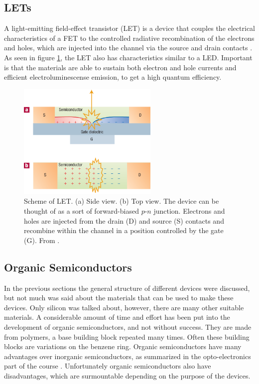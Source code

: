 \subsection{LETs}

A light-emitting field-effect transistor (LET) is a device that couples the electrical characteristics of a FET to the controlled radiative recombination of the electrons and holes, which are injected into the channel via the source and drain contacts \citep{Muccini}. As seen in figure \ref{fig:LET}, the LET also has characteristics similar to a LED. Important is that the materials are able to sustain both electron and hole currents and efficient electroluminescense emission, to get a high quantum efficiency.

\begin{figure}[!ht]
 \begin{center}
  \includegraphics[width=0.6\textwidth]{fig_B1}
  \caption{Scheme of LET. (a) Side view. (b) Top view. The device can be thought of as a sort of forward-biased $p$-$n$ junction. Electrons and holes are injected from the drain (D) and source (S) contacts and recombine within the channel in a position controlled by the gate (G). From \citet{Muccini}.}
  \label{fig:LET}
 \end{center}
\end{figure}


\subsection{Organic Semiconductors}
In the previous sections the general structure of different devices were discussed, but not much was said about the materials that can be used to make these devices. Only silicon was talked about, however, there are many other suitable materials. A considerable amount of time and effort has been put into the development of organic semiconductors, and not without success. They are made from polymers, a base building block repeated many times. Often these building blocks are variations on the benzene ring. Organic semiconductors have many advantages over inorganic semiconductors, as summarized in the opto-electronics part of the course \citep{loinotes}. Unfortunately organic semiconductors also have disadvantages, which are surmountable depending on the purpose of the devices.

